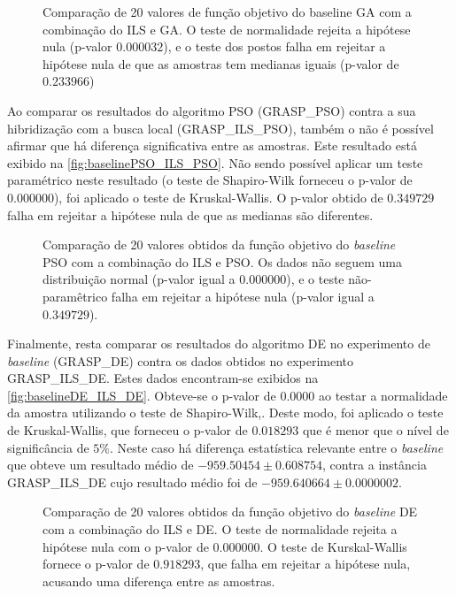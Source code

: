 \begin{figure}
    \centering
    \caption{Comparação de 20 valores de função objetivo do baseline GA com a combinação do ILS e GA. O teste de normalidade rejeita a hipótese nula (p-valor $0.000032$), e o teste dos postos falha em rejeitar a hipótese nula de que as amostras tem medianas iguais (p-valor de $0.233966$) }
    
    \label{fig:baselineGA_ILS_GA}
\end{figure}

Ao comparar os resultados do algoritmo PSO (GRASP\_PSO) contra a sua hibridização com a busca local (GRASP\_ILS\_PSO), também o não é possível afirmar que há diferença significativa entre as amostras. Este resultado está exibido na \autoref{fig:baselinePSO_ILS_PSO}. Não sendo possível aplicar um teste paramétrico neste resultado (o teste de Shapiro-Wilk forneceu o p-valor de $0.000000$), foi aplicado o teste de Kruskal-Wallis. O p-valor obtido de $0.349729$ falha em rejeitar a hipótese nula de que as medianas são diferentes. 

\begin{figure}
    \centering
    \caption{Comparação de 20 valores obtidos da função objetivo do \textit{baseline} PSO com a combinação do ILS e PSO. Os dados não seguem uma distribuição normal (p-valor igual a $0.000000$), e o teste não-paramêtrico falha em rejeitar a hipótese nula (p-valor igual a $0.349729$).}
    
    \label{fig:baselinePSO_ILS_PSO}
\end{figure}

Finalmente, resta comparar os resultados do algoritmo DE no experimento de \textit{baseline} (GRASP\_DE) contra os dados obtidos no experimento GRASP\_ILS\_DE. Estes dados encontram-se exibidos na   \autoref{fig:baselineDE_ILS_DE}.  Obteve-se o p-valor de $0.0000$ ao testar a normalidade da amostra utilizando o teste de Shapiro-Wilk,. Deste modo, foi aplicado o teste de Kruskal-Wallis, que forneceu o p-valor de $0.018293$ que é menor que o nível de significância de $5\%$. Neste caso há diferença estatística relevante entre o \textit{baseline} que obteve um resultado médio de $-959.50454 \pm 0.608754$, contra a instância GRASP\_ILS\_DE cujo resultado médio foi de $-959.640664 \pm 0.0000002$. 

\begin{figure}
    \centering
    \caption{Comparação de 20 valores obtidos da função objetivo do \textit{baseline} DE com a combinação do ILS e DE. O teste de normalidade rejeita a hipótese nula com o p-valor de $0.000000$. O teste de Kurskal-Wallis fornece o p-valor de $0.918293$, que falha em rejeitar a hipótese nula, acusando uma diferença entre as amostras.}
    
    \label{fig:baselineDE_ILS_DE}
\end{figure}



